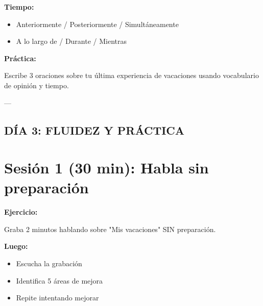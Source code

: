 \documentclass[a4paper,11pt]{article}
\begin{document}
\vspace{0.2cm}

\textbf{Tiempo:}

\begin{itemize}

  \item Anteriormente / Posteriormente / Simultáneamente

  \item A lo largo de / Durante / Mientras

\end{itemize}

\vspace{0.2cm}

\textbf{Práctica:}

Escribe 3 oraciones sobre tu última experiencia de vacaciones usando vocabulario de opinión y tiempo.

\vspace{0.2cm}

---

\vspace{0.2cm}

\subsection{DÍA 3: FLUIDEZ Y PRÁCTICA}

\vspace{0.2cm}

\section{Sesión 1 (30 min): Habla sin preparación}

\vspace{0.2cm}

\textbf{Ejercicio:}

Graba 2 minutos hablando sobre "Mis vacaciones" SIN preparación.

\vspace{0.2cm}

\textbf{Luego:}

\begin{itemize}

  \item Escucha la grabación

  \item Identifica 5 áreas de mejora

  \item Repite intentando mejorar

\end{itemize}
\end{document}
